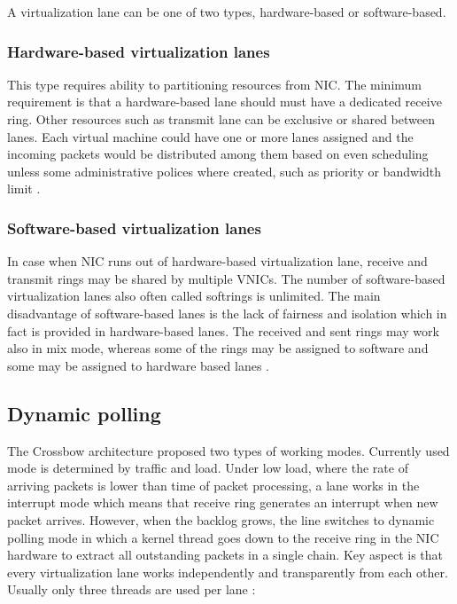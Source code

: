 \documentclass[11pt]{book}
\begin{document}
        A virtualization lane can be one of two types, hardware-based or software-based.

        
        \subsubsection{Hardware-based virtualization lanes}
        
          This type requires ability to partitioning resources from NIC. The minimum requirement is that a
          hardware-based lane should must have a dedicated receive ring.  Other resources such as transmit lane can be
          exclusive or shared between lanes. Each virtual machine could have one or more lanes assigned and the incoming
          packets would be distributed among them based on even scheduling unless some administrative polices where
          created, such as priority or bandwidth limit \cite{crossbow}.		

        
        \subsubsection{Software-based virtualization lanes}
        
          In case when NIC runs out of hardware-based virtualization lane, receive and transmit rings may be shared by
          multiple VNICs. The number of software-based virtualization lanes also often called softrings is unlimited.
          The main disadvantage of software-based lanes is the lack of fairness and isolation which in fact is provided
          in hardware-based lanes. The received and sent rings may work also in mix mode, whereas some of the rings may
          be assigned to software and some may be assigned to hardware based lanes \cite{crossbow}.	
			
      \subsection{Dynamic polling}	
        
        The Crossbow architecture proposed two types of working modes. Currently used mode is determined by traffic and
        load. Under low load, where the rate of arriving packets is lower than time of packet processing, a lane works in
        the interrupt mode which means that receive ring generates an interrupt when new packet arrives. However, when
        the backlog grows, the line switches to dynamic polling mode in which a kernel thread goes down to the receive
        ring in the NIC hardware to extract all outstanding packets in a single chain. Key aspect is that every
        virtualization lane works independently and transparently from each other. Usually only three threads are used
        per lane \cite{crossbow}:
        
\end{document}
